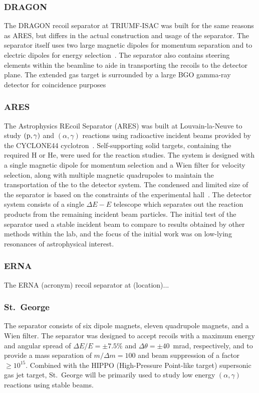 \subsubsection{DRAGON}
The DRAGON recoil separator at TRIUMF-ISAC was built for the same reasons as ARES,
but differs in the actual construction and usage of the separator.
The separator
itself uses two large magnetic dipoles for momentum separation and to electric
dipoles for energy selection~\cite{Engel2005}. The separator also contains
steering elements within the beamline to aide in transporting the recoils to
the detector plane. The extended gas target is surrounded by a large BGO
gamma-ray detector for coincidence purposes

\subsubsection{ARES}
The Astrophysics REcoil Separator (ARES) was built at Louvain-la-Neuve to
study $(\rm{p},\gamma)$ and $(\alpha,\gamma)$ reactions using radioactive
incident beams provided by the CYCLONE44 cyclotron~\cite{Angulo2001}.
Self-supporting solid
targets, containing the required H or He, were used for the reaction
studies. The system is designed with a single magnetic dipole for momentum
selection and a Wien filter for velocity selection, along with multiple
magnetic quadrupoles to maintain the transportation of the to the detector
system. The condensed and limited size of the separator is based on the
constraints of the experimental hall~\cite{Couder2003}.
The detector system consists of a single
$\Delta E − E$ telescope which separates out the reaction products from the
remaining incident beam particles. The initial test of the separator used a
stable incident beam to compare to results obtained by other methods within
the lab, and the focus of the initial work was on low-lying resonances of
astrophysical interest.

\subsubsection{ERNA}
The ERNA (acronym) recoil separator at (location)...

\subsubsection{St.\ George}
The separator consists of six dipole magnets, eleven quadrupole magnets, and a
Wien filter. The separator was designed to accept recoils with a maximum
energy and angular spread of $\Delta E/E = \pm7.5\%$ and
$\Delta\theta = \pm40$~mrad, respectively, and to provide a mass separation
of $m/\Delta m = 100$ and beam suppression of a factor $\geq 10^{15}$. Combined
with the HIPPO (High-Pressure Point-like target) supersonic gas jet target,
St.\ George will be primarily used to study low energy $(\alpha,\gamma)$
reactions using stable beams.
